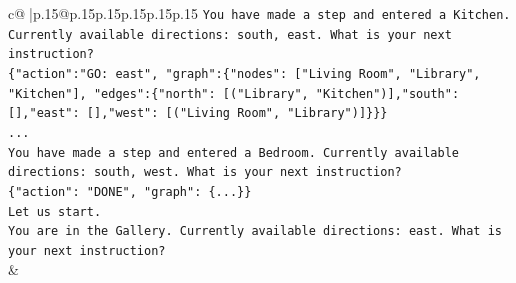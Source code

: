 \documentclass{article}
\begin{document}
{\begin{supertabular}{c@{$\;$}|p{.15\linewidth}@{}p{.15\linewidth}p{.15\linewidth}p{.15\linewidth}p{.15\linewidth}p{.15\linewidth}}
{{{\texttt{You have made a step and entered a Kitchen. Currently available directions: south, east. What is your next instruction?} \\
\texttt{\{"action":"GO: east", "graph":\{"nodes": {[}"Living Room", "Library", "Kitchen"{]}, "edges":\{"north": {[}("Library", "Kitchen"){]},"south": {[}{]},"east": {[}{]},"west": {[}("Living Room", "Library"){]}\}\}\}} \\
\texttt{...} \\
\texttt{You have made a step and entered a Bedroom. Currently available directions: south, west. What is your next instruction?} \\
\texttt{\{"action": "DONE", "graph": \{...\}\}} \\
\texttt{Let us start.} \\
\texttt{You are in the Gallery. Currently available directions: east. What is your next instruction?} \\
            }
        }
    }
    & \\ \\


\end{supertabular}}
\end{document}
